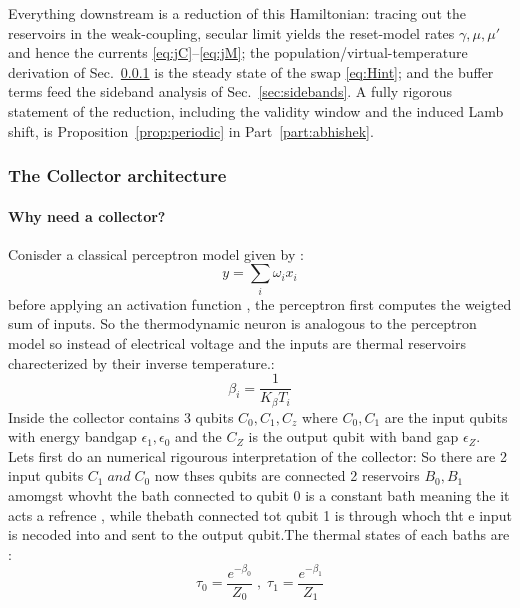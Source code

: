 \documentclass[11pt,a4paper]{article}
\theoremstyle{definition}
\theoremstyle{remark}
\begin{document}
Everything downstream is a reduction of this Hamiltonian: tracing out
the reservoirs in the weak-coupling, secular limit yields the
reset-model rates $\gamma,\mu,\mu'$ and hence the currents
\eqref{eq:jC}--\eqref{eq:jM}; the population/virtual-temperature
derivation of Sec.~\ref{sec:collector-arch} is the steady state of the
swap \eqref{eq:Hint}; and the buffer terms feed the sideband analysis of
Sec.~\ref{sec:sidebands}. A fully rigorous statement of the reduction,
including the validity window and the induced Lamb shift, is
Proposition~\ref{prop:periodic} in Part~\ref{part:abhishek}.

\subsubsection{The Collector architecture}
\label{sec:collector-arch}
\paragraph{Why need a collector?}
Conisder a classical perceptron model given by :
\[
y = \sum_i\omega_ix_i
\]
before applying an activation function , the perceptron first computes the weigted sum of inputs. So the thermodynamic neuron is analogous to the perceptron model so instead of electrical voltage and the inputs are thermal reservoirs charecterized by their inverse temperature.:
\[
\beta_i =  \frac{1}{K_\beta T_i}
\]
Inside the collector contains 3 qubits \(C_0 , C_1 ,C_z\) where \(C_0 , C_1\) are the input qubits with energy bandgap \(\epsilon_1 , \epsilon_0\) and the \(C_Z\) is the output qubit with band gap \(\epsilon_Z\). \\
Lets first do an numerical rigourous interpretation of the collector:
So there are 2 input qubits \(C_1 \;and \; C_0\) now thses qubits are connected 2 reservoirs \(B_0 , B_1\) amomgst whovht the bath connected to qubit 0 is a constant bath meaning the it acts a refrence , while thebath connected tot qubit 1 is through whoch tht e input is necoded into and sent to the output qubit.The thermal states of each baths are :
\[
\tau_0 = \frac{e^{-\beta_0}}{Z_0} \; , \; \tau_1 = \frac{e^{-\beta_1}}{Z_1}  
\]
\end{document}
